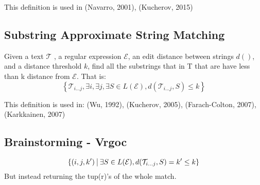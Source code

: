 \documentclass{article}
\newcommand{\set}[1]{\left\{#1\right\}}
\newcommand{\st}{\ \vline \ }
\begin{document}
This definition is used in (Navarro, 2001), (Kucherov, 2015)

\subsection{Substring Approximate String Matching}

Given a text $\mathcal{T}$ , a regular expression $\mathcal{E}$,
an edit distance between strings $d()$, and a distance threshold
$k$, find all the substrings that in T that are have less than k
distance from $\mathcal{E}$. That is:
\begin{equation*}
    \set{\mathcal{T}_{i...j}, \exists i, \exists j, \exists S \in L(\mathcal{E}), d(\mathcal{T}_{i...j} , S) \leq k}
\end{equation*}

This definition is used in: (Wu, 1992), (Kucherov, 2005), (Farach-Colton, 2007), (Karkkainen, 2007)

\subsection{Brainstorming - Vrgoc}
\begin{equation*}
    \set{(i, j, k') \st \exists S \in L(\mathcal{E}), d(\mathcal{T}_{i...j},S) = k' \leq k}
\end{equation*}
But instead returning the tup(r)'s of the whole match.
\end{document}
